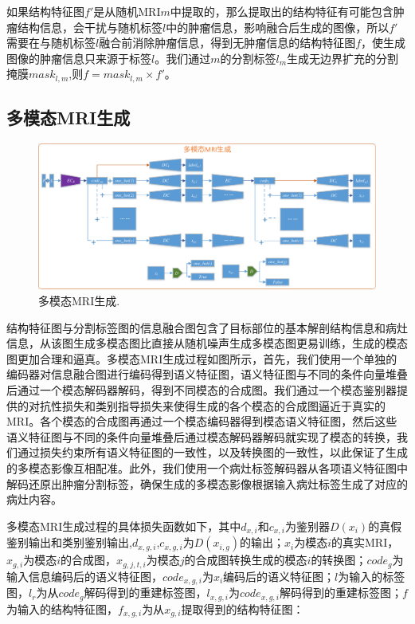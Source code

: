 \documentclass[letterpaper]{article} %
\begin{document}
如果结构特征图$f'$是从随机MRI$m$中提取的，那么提取出的结构特征有可能包含肿瘤结构信息，会干扰与随机标签$l$中的肿瘤信息，影响融合后生成的图像，所以$f'$需要在与随机标签$l$融合前消除肿瘤信息，得到无肿瘤信息的结构特征图$f$，使生成图像的肿瘤信息只来源于标签$l$。我们通过$m$的分割标签$l_m$生成无边界扩充的分割掩膜$mask_{l,m}$,则$f=mask_{l,m}\times f'$。

\subsection{多模态MRI生成}
\begin{figure}
	\centering
	\includegraphics[width=0.98\linewidth]{figures/mm_mri_generate}
	\caption{多模态MRI生成.}
	\label{mm_mri_generate}
\end{figure}
结构特征图与分割标签图的信息融合图包含了目标部位的基本解剖结构信息和病灶信息，从该图生成多模态图比直接从随机噪声生成多模态图更易训练，生成的模态图更加合理和逼真。多模态MRI生成过程如图所示，首先，我们使用一个单独的编码器对信息融合图进行编码得到语义特征图，语义特征图与不同的条件向量堆叠后通过一个模态解码器解码，得到不同模态的合成图。我们通过一个模态鉴别器提供的对抗性损失和类别指导损失来使得生成的各个模态的合成图逼近于真实的MRI。各个模态的合成图再通过一个模态编码器得到模态语义特征图，然后这些语义特征图与不同的条件向量堆叠后通过模态解码器解码就实现了模态的转换，我们通过损失约束所有语义特征图的一致性，以及转换图的一致性，以此保证了生成的多模态影像互相配准。此外，我们使用一个病灶标签解码器从各项语义特征图中解码还原出肿瘤分割标签，确保生成的多模态影像根据输入病灶标签生成了对应的病灶内容。

多模态MRI生成过程的具体损失函数如下，其中$d_{x,i}$和$c_{x,i}$为鉴别器$D(x_i)$的真假鉴别输出和类别鉴别输出,$d_{x,g,i}$,$c_{x,g,i}$为$D(x_{i,g})$的输出；$x_i$为模态$i$的真实MRI，$x_{g,i}$为模态$i$的合成图，$x_{g,j,t,i}$为模态$j$的合成图转换生成的模态$i$的转换图；$code_g$为输入信息编码后的语义特征图，$code_{x,g,i}$为$x_i$编码后的语义特征图；$l$为输入的标签图，$l_r$为从$code_g$解码得到的重建标签图，$l_{x,g,i}$为$code_{x,g,i}$解码得到的重建标签图；$f$为输入的结构特征图，$f_{x,g,i}$为从$x_{g,i}$提取得到的结构特征图：
\end{document}
